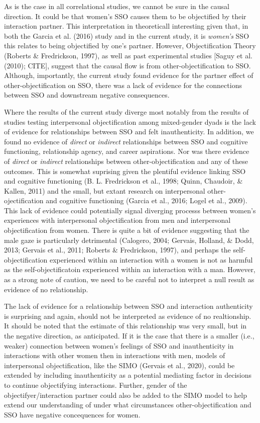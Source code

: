 \documentclass[
  man]{apa6}
\begin{document}
As is the case in all correlational studies, we cannot be sure in the
causal direction. It could be that women's SSO causes them to be
objectified by their interaction partner. This interpretation in
theoreticall interesting given that, in both the Garcia et al. (2016)
study and in the current study, it is \emph{women's} SSO this relates to
being objectified by one's partner. However, Objectification Theory
(Roberts \& Fredrickson, 1997), as well as past experimental studies
{[}Saguy et al. (2010); CITE{]}, suggest that the causal flow is from
other-objectification to SSO. Although, importantly, the current study
found evidence for the partner effect of other-objectification on SSO,
there was a lack of evidence for the connections between SSO and
downstream negative consequences.

Where the results of the current study diverge most notably from the
results of studies testing interpersonal objectification among
mixed-gender dyads is the lack of evidence for relationships between SSO
and felt inauthenticity. In addition, we found no evidence of
\emph{direct} or \emph{indirect} relationships between SSO and cognitive
functioning, relationship agency, and career aspirations. Nor was there
evidence of \emph{direct} or \emph{indirect} relationships between
other-objectification and any of these outcomes. This is somewhat
suprising given the plentiful evidence linking SSO and cognitive
functioning (B. L. Fredrickson et al., 1998; Quinn, Chaudoir, \& Kallen,
2011) and the small, but extant research on interpersonal
other-ojectification and cognitive functioning (Garcia et al., 2016;
Logel et al., 2009). This lack of evidence could potentially signal
diverging processs between women's experiences with interpersonal
objectification from men and interpersonal objectification from women.
There is quite a bit of evidence suggesting that the male gaze is
particularly detrimental (Calogero, 2004; Gervais, Holland, \& Dodd,
2013; Gervais et al., 2011; Roberts \& Fredrickson, 1997), and perhaps
the self-objectification experienced within an interaction with a women
is not as harmful as the self-objectificatoin experienced within an
interaction with a man. However, as a strong note of caution, we need to
be careful not to interpret a null result as evidence of no
relationship.

The lack of evidence for a relationship between SSO and interaction
authenticity is surprising and again, should not be interpreted as
evidence of no realtionship. It should be noted that the estimate of
this relationship was very small, but in the negative direction, as
anticipated. If it is the case that there is a smaller (i.e., weaker)
connection between women's feelings of SSO and inauthenticity in
interactions with other women then in interactions with men, models of
interpersonal objectification, like the SIMO (Gervais et al., 2020),
could be extended by including inauthenticity as a potential mediating
factor in decisions to continue objectifying interactions. Further,
gender of the objectifyer/interaction partner could also be added to the
SIMO model to help extend our understanding of under what circumstances
other-objectification and SSO have negative concequences for women.
\end{document}
